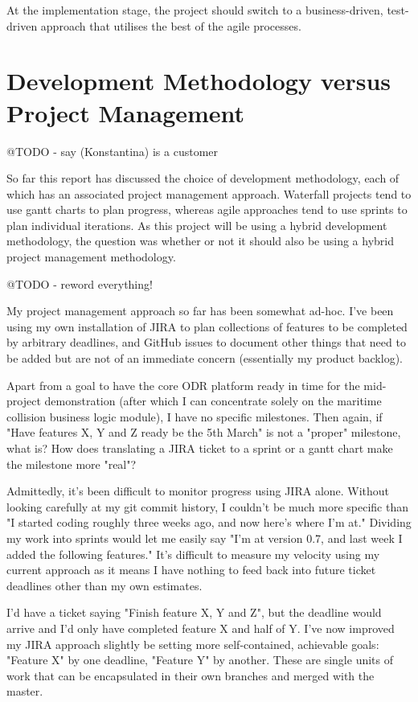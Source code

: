 At the implementation stage, the project should switch to a business-driven, test-driven approach that utilises the best of the agile processes.

\section{Development Methodology versus Project Management}

@TODO - say (Konstantina) is a customer 

So far this report has discussed the choice of development methodology, each of which has an associated project management approach. Waterfall projects tend to use gantt charts to plan progress, whereas agile approaches tend to use sprints to plan individual iterations. As this project will be using a hybrid development methodology, the question was whether or not it should also be using a hybrid project management methodology.

@TODO - reword everything!

My project management approach so far has been somewhat ad-hoc. I've been using my own installation of JIRA to plan collections of features to be completed by arbitrary deadlines, and GitHub issues to document other things that need to be added but are not of an immediate concern (essentially my product backlog).

Apart from a goal to have the core ODR platform ready in time for the mid-project demonstration (after which I can concentrate solely on the maritime collision business logic module), I have no specific milestones. Then again, if "Have features X, Y and Z ready be the 5th March" is not a "proper" milestone, what is? How does translating a JIRA ticket to a sprint or a gantt chart make the milestone more "real"?

Admittedly, it's been difficult to monitor progress using JIRA alone. Without looking carefully at my git commit history, I couldn't be much more specific than "I started coding roughly three weeks ago, and now here's where I'm at." Dividing my work into sprints would let me easily say "I'm at version 0.7, and last week I added the following features." It's difficult to measure my velocity using my current approach as it means I have nothing to feed back into future ticket deadlines other than my own estimates.

I'd have a ticket saying "Finish feature X, Y and Z", but the deadline would arrive and I'd only have completed feature X and half of Y. I've now improved my JIRA approach slightly be setting more self-contained, achievable goals: "Feature X" by one deadline, "Feature Y" by another. These are single units of work that can be encapsulated in their own branches and merged with the master.

